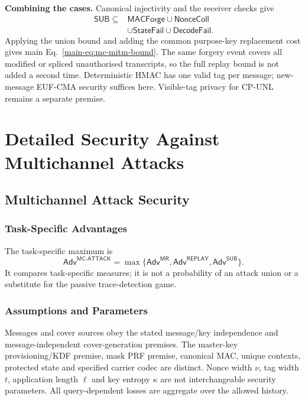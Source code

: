 \documentclass[journal]{IEEEtran}
\theoremstyle{definition}
\theoremstyle{game}
\begin{document}
\textbf{Combining the cases.}
Canonical injectivity and the receiver checks give
\begin{equation}\label{supp-eq:mitm-decomposition}
\begin{aligned}
\mathsf{SUB}\subseteq{}&\mathsf{MACForge}\cup\mathsf{NonceColl}\\
&\cup\mathsf{StateFail}\cup\mathsf{DecodeFail}.
\end{aligned}
\end{equation}
Applying the union bound and adding the common purpose-key replacement
cost gives main Eq.~\eqref{main-eq:mc-mitm-bound}. The same forgery
event covers all modified or spliced unauthorised transcripts, so the
full replay bound is not added a second time. Deterministic HMAC has one
valid tag per message; new-message EUF-CMA security suffices here.
Visible-tag privacy for CP-UNL remains a separate premise.

\section{Detailed Security Against Multichannel Attacks}
\label{sec:detailed-mc-security}
\subsection{Multichannel Attack Security}
\subsubsection{Task-Specific Advantages}
The task-specific maximum is
\[
\mathsf{Adv}^{\mathsf{MC\text{-}ATTACK}}=
\max\{\mathsf{Adv}^{\mathsf{MR}},\mathsf{Adv}^{\mathsf{REPLAY}},
\mathsf{Adv}^{\mathsf{SUB}}\}.
\]
It compares task-specific measures; it is not a probability of an attack
union or a substitute for the passive trace-detection game.

\subsubsection{Assumptions and Parameters}
Messages and cover sources obey the stated message/key independence and
message-independent cover-generation premises. The master-key provisioning/KDF
premise, mask PRF premise, canonical MAC,
unique contexts, protected state and specified carrier codec are distinct.
Nonce width $\nu$, tag width $t$, application length $\ell$ and key entropy
$\kappa$ are not interchangeable security parameters. All query-dependent
losses are aggregate over the allowed history.
\end{document}
